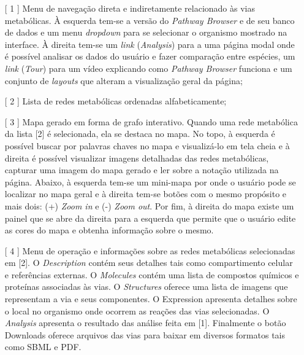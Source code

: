 \begin{itemize}
\item[[ 1]] Menu de navegação direta e indiretamente relacionado às vias metabólicas. À esquerda tem-se a versão do \textit{Pathway Browser} e de seu banco de dados e um menu \textit{dropdown} para se selecionar o organismo mostrado na interface. À direita tem-se um \textit{link} (\textit{Analysis}) para a uma página modal onde é possível analisar os dados do usuário e fazer comparação entre espécies, um \textit{link} (\textit{Tour}) para um vídeo explicando como \textit{Pathway Browser} funciona e um conjunto de \textit{layouts} que alteram a visualização geral da página;
\item[[ 2]] Lista de redes metabólicas ordenadas alfabeticamente;
\item[[ 3]] Mapa gerado em forma de grafo interativo. Quando uma rede metabólica da lista [2] é selecionada, ela se destaca no mapa. No topo, à esquerda é possível buscar por palavras chaves no mapa e visualizá-lo em tela cheia e à direita é possível visualizar imagens detalhadas das redes metabólicas, capturar uma imagem do mapa gerado e ler sobre a notação utilizada na página. Abaixo, à esquerda tem-se um mini-mapa por onde o usuário pode se localizar no mapa geral e à direita tem-se botões com o mesmo propósito e mais dois: (+) \textit{Zoom in} e (-) \textit{Zoom out}. Por fim, à direita do mapa existe um painel que se abre da direita para a esquerda que permite que o usuário edite as cores do mapa e obtenha informação sobre o mesmo.
\item[[ 4]] Menu de operação e informações sobre as redes metabólicas selecionadas em [2]. O \textit{Description} contém seus detalhes tais como compartimento celular e referências externas. O \textit{Molecules} contém uma lista de compostos químicos e proteínas associadas às vias. O \textit{Structures} oferece uma lista de imagens que representam a via e seus componentes. O Expression apresenta detalhes sobre o local no organismo onde ocorrem as reações das vias selecionadas. O \textit{Analysis} apresenta o resultado das análise feita em [1]. Finalmente o botão Downloads oferece arquivos das vias para baixar em diversos formatos tais como SBML e PDF. 
\end{itemize}
\textbf{ }\\


